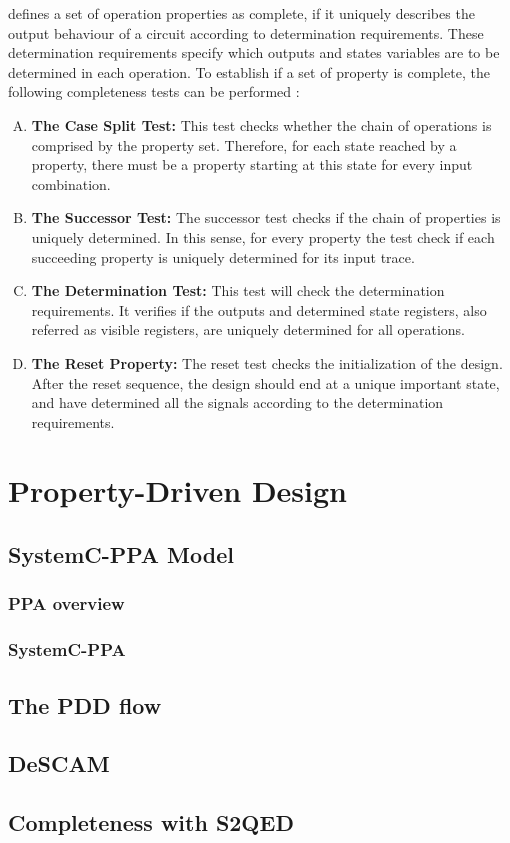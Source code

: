 \cite{paper-gapfree} defines a set of operation properties as complete, if it uniquely describes the output behaviour of a circuit according to determination requirements. These determination requirements specify which outputs and states variables are to be determined in each operation. To establish if a set of property is complete, the following completeness tests can be performed \cite{guide-onespin}:

\begin{enumerate}[A.]
    \item \textbf{The Case Split Test:} This test checks whether the chain of operations is comprised by the property set. Therefore, for each state reached by a property, there must be a property starting at this state for every input combination.
    \item \textbf{The Successor Test:} The successor test checks if the chain of properties is uniquely determined. In this sense, for every property the test check if each succeeding property is uniquely determined for its input trace.
    \item \textbf{The Determination Test:} This test will check the determination requirements. It verifies if the outputs and determined state registers, also referred as visible registers, are uniquely determined for all operations.
    \item \textbf{The Reset Property:} The reset test checks the initialization of the design. After the reset sequence, the design should end at a unique important state, and have determined all the signals according to the determination requirements.
\end{enumerate}

\section{Property-Driven Design}

\subsection{SystemC-PPA Model}

\subsubsection{PPA overview}

\subsubsection{SystemC-PPA}

\subsection{The PDD flow}

\subsection{DeSCAM}

\subsection{Completeness with S2QED}


